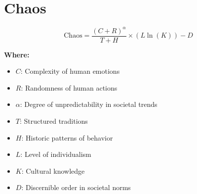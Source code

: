 \chapter{Chaos}

\begin{equation}
\text{Chaos} = \frac{{\left( C + R \right)^\alpha}}{{T + H}} \times \left( L \ln{(K)} \right) - D
\end{equation}

\textbf{Where:}

\begin{itemize}
    \item $C$: Complexity of human emotions
    \item $R$: Randomness of human actions
    \item $\alpha$: Degree of unpredictability in societal trends
    \item $T$: Structured traditions
    \item $H$: Historic patterns of behavior
    \item $L$: Level of individualism
    \item $K$: Cultural knowledge
    \item $D$: Discernible order in societal norms
\end{itemize}